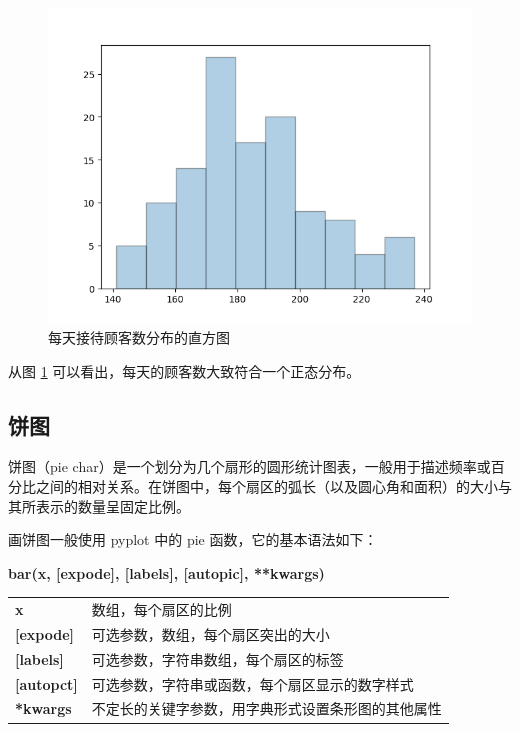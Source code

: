 \begin{figure}[!ht]
  \centering
  \includegraphics[scale=0.8]{figure/hist.png}
  \caption{每天接待顾客数分布的直方图}\label{fig:hist}
\end{figure}

从图 \ref{fig:hist} 可以看出，每天的顾客数大致符合一个正态分布。

\subsection{饼图}

饼图（pie char）是一个划分为几个扇形的圆形统计图表，一般用于描述频率或百分比之间的相对关系。在饼图中，每个扇区的弧长（以及圆心角和面积）的大小与其所表示的数量呈固定比例。

画饼图一般使用 pyplot 中的 pie 函数，它的基本语法如下：

\begin{center}
\begin{tcolorbox}[title = pie 函数的语法]
\textbf{bar(x, [expode], [labels], [autopic], **kwargs)}
\tcblower
\vspace{10pt}

\begin{tcboutputlisting}
\begin{tabular}{>{\bfseries}ll}
    x &数组，每个扇区的比例\\

    [expode] & 可选参数，数组，每个扇区突出的大小\\

  [labels] &可选参数，字符串数组，每个扇区的标签\\

  [autopct] &可选参数，字符串或函数，每个扇区显示的数字样式\\

**kwargs &不定长的关键字参数，用字典形式设置条形图的其他属性
\end{tabular}
\end{tcboutputlisting}
\tcbuselistingtext
\end{tcolorbox}
\end{center}

